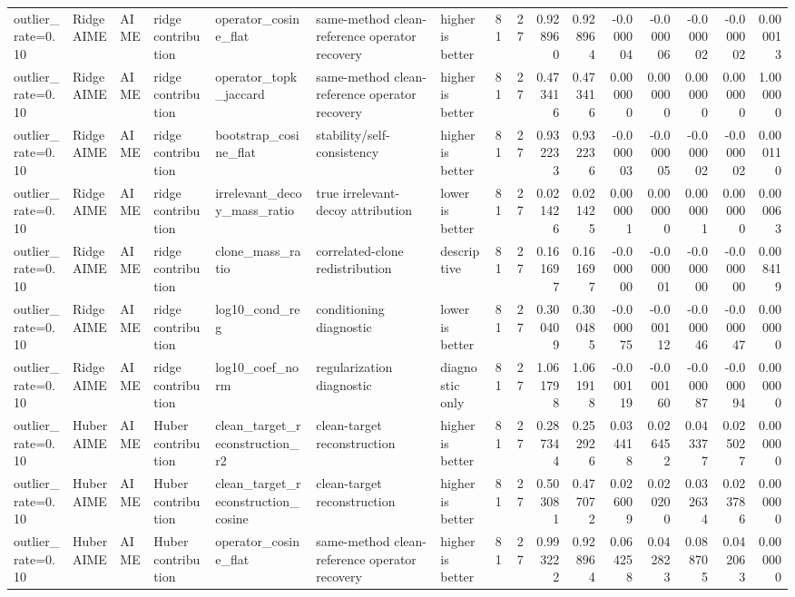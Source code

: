 \begin{table}[t]
\begin{tabular}{lllllllrrrrrrrrr}
outlier_rate=0.10 & RidgeAIME & AIME & ridge contribution & operator_cosine_flat & same-method clean-reference operator recovery & higher is better & 81 & 27 & 0.928960 & 0.928964 & -0.000004 & -0.000006 & -0.000002 & -0.000002 & 0.000013 \\
outlier_rate=0.10 & RidgeAIME & AIME & ridge contribution & operator_topk_jaccard & same-method clean-reference operator recovery & higher is better & 81 & 27 & 0.473416 & 0.473416 & 0.000000 & 0.000000 & 0.000000 & 0.000000 & 1.000000 \\
outlier_rate=0.10 & RidgeAIME & AIME & ridge contribution & bootstrap_cosine_flat & stability/self-consistency & higher is better & 81 & 27 & 0.932233 & 0.932236 & -0.000003 & -0.000005 & -0.000002 & -0.000002 & 0.000110 \\
outlier_rate=0.10 & RidgeAIME & AIME & ridge contribution & irrelevant_decoy_mass_ratio & true irrelevant-decoy attribution & lower is better & 81 & 27 & 0.021426 & 0.021425 & 0.000001 & 0.000000 & 0.000001 & 0.000000 & 0.000063 \\
outlier_rate=0.10 & RidgeAIME & AIME & ridge contribution & clone_mass_ratio & correlated-clone redistribution & descriptive & 81 & 27 & 0.161697 & 0.161697 & -0.000000 & -0.000001 & -0.000000 & -0.000000 & 0.008419 \\
outlier_rate=0.10 & RidgeAIME & AIME & ridge contribution & log10_cond_reg & conditioning diagnostic & lower is better & 81 & 27 & 0.300409 & 0.300485 & -0.000075 & -0.000112 & -0.000046 & -0.000047 & 0.000000 \\
outlier_rate=0.10 & RidgeAIME & AIME & ridge contribution & log10_coef_norm & regularization diagnostic & diagnostic only & 81 & 27 & 1.061798 & 1.061918 & -0.000119 & -0.000160 & -0.000087 & -0.000094 & 0.000000 \\
outlier_rate=0.10 & HuberAIME & AIME & Huber contribution & clean_target_reconstruction_r2 & clean-target reconstruction & higher is better & 81 & 27 & 0.287344 & 0.252926 & 0.034418 & 0.026452 & 0.043377 & 0.025027 & 0.000000 \\
outlier_rate=0.10 & HuberAIME & AIME & Huber contribution & clean_target_reconstruction_cosine & clean-target reconstruction & higher is better & 81 & 27 & 0.503081 & 0.477072 & 0.026009 & 0.020200 & 0.032634 & 0.023786 & 0.000000 \\
outlier_rate=0.10 & HuberAIME & AIME & Huber contribution & operator_cosine_flat & same-method clean-reference operator recovery & higher is better & 81 & 27 & 0.993222 & 0.928964 & 0.064258 & 0.042823 & 0.088705 & 0.042063 & 0.000000 \\

\end{tabular}
\end{table}

